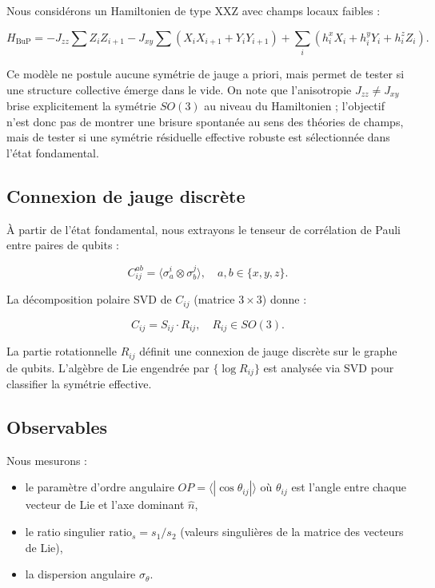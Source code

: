 \documentclass[11pt]{article}
\begin{document}
Nous considérons un Hamiltonien de type XXZ avec champs locaux faibles :

\[
H_{\mathrm{BuP}} =
- J_{zz}\sum Z_i Z_{i+1}
- J_{xy}\sum (X_iX_{i+1}+Y_iY_{i+1})
+ \sum_i (h_i^x X_i + h_i^y Y_i + h_i^z Z_i).
\]

Ce modèle ne postule aucune symétrie de jauge a priori, mais permet de tester si une structure collective émerge dans le vide. On note que l'anisotropie $J_{zz} \neq J_{xy}$ brise explicitement la symétrie $SO(3)$ au niveau du Hamiltonien ; l'objectif n'est donc pas de montrer une brisure spontanée au sens des théories de champs, mais de tester si une symétrie résiduelle effective robuste est sélectionnée dans l'état fondamental.

\subsection{Connexion de jauge discrète}

À partir de l'état fondamental, nous extrayons le tenseur de corrélation de Pauli entre paires de qubits :

\[
C_{ij}^{ab} = \langle \sigma_a^i \otimes \sigma_b^j \rangle, \quad a,b \in \{x,y,z\}.
\]

La décomposition polaire SVD de $C_{ij}$ (matrice $3\times3$) donne :

\[
C_{ij} = S_{ij} \cdot R_{ij}, \quad R_{ij} \in SO(3).
\]

La partie rotationnelle $R_{ij}$ définit une connexion de jauge discrète sur le graphe de qubits. L'algèbre de Lie engendrée par $\{\log R_{ij}\}$ est analysée via SVD pour classifier la symétrie effective.

\subsection{Observables}

Nous mesurons :

\begin{itemize}
\item le paramètre d'ordre angulaire $OP = \langle |\cos\theta_{ij}| \rangle$ où $\theta_{ij}$ est l'angle entre chaque vecteur de Lie et l'axe dominant $\hat{n}$,
\item le ratio singulier $\mathrm{ratio}_s = s_1 / s_2$ (valeurs singulières de la matrice des vecteurs de Lie),
\item la dispersion angulaire $\sigma_\theta$.
\end{itemize}
\end{document}
